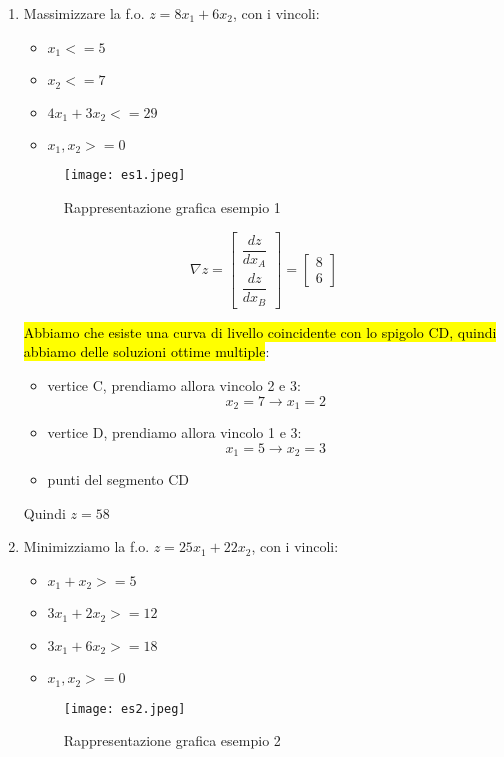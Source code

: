 \begin{enumerate}
	\item Massimizzare la f.o. $z = 8x_1 + 6x_2$, con i vincoli:
		\begin{itemize}
			\item $x_1 <= 5$
			\item $x_2 <= 7$
			\item $4x_1 + 3x_2 <= 29$
			\item $x_1, x_2 >= 0$
		\end{itemize}
		
		\begin{figure}[H]
		\centering
		\texttt{[image: es1.jpeg]}
		\caption{Rappresentazione grafica esempio 1} 
		\label{rge1}
		\end{figure}
		
		$$\nabla z = \left[\begin{array}{c}
			\dfrac{dz}{dx_A}\\
			\dfrac{dz}{dx_B}
		\end{array}\right] = \left[\begin{array}{c}
			8\\
			6
		\end{array}\right]
		$$
		
		\hl{Abbiamo che esiste una curva di livello coincidente con lo spigolo CD, quindi abbiamo delle soluzioni ottime multiple}:
		\begin{itemize}
			\item vertice C, prendiamo allora vincolo 2 e 3:
				$$x_2 = 7 \to x_1 = 2$$
			
			\item vertice D, prendiamo allora vincolo 1 e 3:
				$$x_1 = 5 \to x_2 = 3$$
		
			\item punti del segmento CD
		\end{itemize}
		
		Quindi $z = 58$
	
	
	\item Minimizziamo la f.o. $z = 25x_1 + 22x_2$, con i vincoli:
		\begin{itemize}
			\item $x_1 + x_2 >= 5$
			\item $3x_1 + 2x_2 >= 12$
			\item $3x_1 + 6x_2 >= 18$
			\item $x_1, x_2 >= 0$
		\end{itemize}
		
		\begin{figure}[H]
		\centering
		\texttt{[image: es2.jpeg]}
		\caption{Rappresentazione grafica esempio 2} 
		\label{rge2}
		\end{figure}
		

\end{enumerate}
